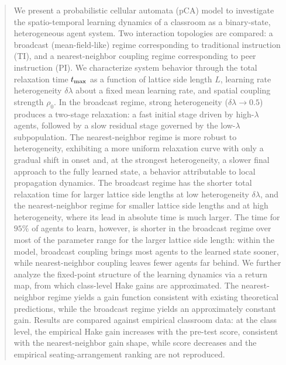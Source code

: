 \documentclass[a4paper,fleqn]{cas-sc}
\begin{document}
\begin{abstract}
  We present a probabilistic cellular automata (pCA) model to investigate the spatio-temporal learning dynamics of a classroom as a binary-state, heterogeneous agent system. Two interaction topologies are compared: a broadcast (mean-field-like) regime corresponding to traditional instruction (TI), and a nearest-neighbor coupling regime corresponding to peer instruction (PI). We characterize system behavior through the total relaxation time $t_{\rm max}$ as a function of lattice side length $L$, learning rate heterogeneity $\delta\lambda$ about a fixed mean learning rate, and spatial coupling strength $\rho_0$. In the broadcast regime, strong heterogeneity ($\delta\lambda \to 0.5$) produces a two-stage relaxation: a fast initial stage driven by high-$\lambda$ agents, followed by a slow residual stage governed by the low-$\lambda$ subpopulation. The nearest-neighbor regime is more robust to heterogeneity, exhibiting a more uniform relaxation curve with only a gradual shift in onset and, at the strongest heterogeneity, a slower final approach to the fully learned state, a behavior attributable to local propagation dynamics.  The broadcast regime has the shorter total relaxation time for larger lattice side lengths at low heterogeneity $\delta\lambda$, and the nearest-neighbor regime for smaller lattice side lengths and at high heterogeneity, where its lead in absolute time is much larger. The time for $95\%$ of agents to learn, however, is shorter in the broadcast regime over most of the parameter range for the larger lattice side length: within the model, broadcast coupling brings most agents to the learned state sooner, while nearest-neighbor coupling leaves fewer agents far behind. We further analyze the fixed-point structure of the learning dynamics via a return map, from which class-level Hake gains are approximated. The nearest-neighbor regime yields a gain function consistent with existing theoretical predictions, while the broadcast regime yields an approximately constant gain. Results are compared against empirical classroom data: at the class level, the empirical Hake gain increases with the pre-test score, consistent with the nearest-neighbor gain shape, while score decreases and the empirical seating-arrangement ranking are not reproduced.
\end{abstract}

\end{document}
